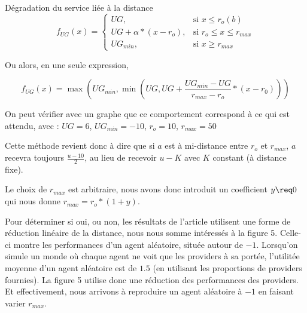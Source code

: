 \begin{hypothese}{Dégradation du service liée à la distance}
$$ f_{UG}(x)= 
\begin{cases}
    UG,                 & \text{si } x \leq r_o(b)\\
    UG + \alpha * (x - r_o),  & \text{si } r_o \leq x \leq r_{max}\\
    UG_{min},  & \text{si } x \geq r_{max}
\end{cases} $$

Ou alors, en une seule expression, 

$$ f_{UG}(x) = \max(UG_{min}, \min(UG, UG + \dfrac{UG_{min} - UG}{r_{max} - r_o} * (x - r_0))) $$

On peut vérifier avec un graphe que ce comportement correspond à ce qui est attendu, avec : $UG = 6$, $UG_{min} = -10$, $r_o = 10$, $r_{max} = 50$\newline


\begin{center}
\end{center}

\noindent Cette méthode revient donc à dire que si $a$ est à mi-distance entre $r_o$ et $r_{max}$, $a$ recevra toujours $\frac{u - 10}{2}$, au lieu de recevoir $u - K$ avec $K$ constant (à distance fixe).\newline

Le choix de $r_{max}$ est arbitraire, nous avons donc introduit un coefficient $y \req 0$ qui nous donne $r_{max} = r_o * (1 + y)$.\newline

\greysep

Pour déterminer si oui, ou non, les résultats de l'article utilisent une forme de réduction linéaire de la distance, nous nous somme intéressés à la figure 5. Celle-ci montre les performances d'un agent aléatoire, située autour de $-1$. Lorsqu'on simule un monde où chaque agent ne voit que les providers à sa portée, l'utilitée moyenne d'un agent aléatoire est de $1.5$ (en utilisant les proportions de providers fournies). La figure 5 utilise donc une réduction des performances des providers. Et effectivement, nous arrivons à reproduire un agent aléatoire à $-1$ en faisant varier $r_{max}$.\newline


\end{hypothese}

